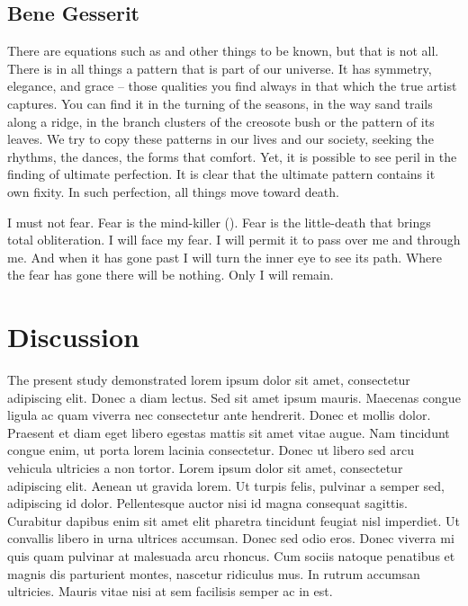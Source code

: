 \subsection*{Bene Gesserit}

There are equations such as  and other things to be known\cite{Hill78a}, but that is not all. There is in
all things a pattern that is part of our universe. It has symmetry, elegance, and grace -- those qualities you find
always in that which the true artist captures. You can find it in the turning of the seasons, in the way sand trails
along a ridge, in the branch clusters of the creosote bush or the pattern of its leaves. We try to copy these patterns
in our lives and our society, seeking the rhythms, the dances, the forms that comfort. Yet, it is possible to see peril
in the finding of ultimate perfection. It is clear that the ultimate pattern contains it own fixity. In such
perfection, all things move toward death.

 I must not fear. Fear is the mind-killer (). Fear is the little-death that brings total
obliteration. I will face my fear. I will permit it to pass over me and through me. And when it has gone past I will
turn the inner eye to see its path. Where the fear has gone there will be nothing. Only I will remain. 

\section*{Discussion}

The present study demonstrated lorem ipsum dolor sit amet, consectetur adipiscing elit. Donec a diam lectus. Sed sit
amet ipsum mauris. Maecenas congue ligula ac quam viverra nec consectetur ante hendrerit. Donec et mollis dolor.
Praesent et diam eget libero egestas mattis sit amet vitae augue. Nam tincidunt congue enim, ut porta lorem lacinia
consectetur. Donec ut libero sed arcu vehicula ultricies a non tortor. Lorem ipsum dolor sit amet, consectetur
adipiscing elit. Aenean ut gravida lorem. Ut turpis felis, pulvinar a semper sed, adipiscing id dolor. Pellentesque
auctor nisi id magna consequat sagittis. Curabitur dapibus enim sit amet elit pharetra tincidunt feugiat nisl
imperdiet. Ut convallis libero in urna ultrices accumsan. Donec sed odio eros. Donec viverra mi quis quam pulvinar at
malesuada arcu rhoncus. Cum sociis natoque penatibus et magnis dis parturient montes, nascetur ridiculus mus. In rutrum
accumsan ultricies. Mauris vitae nisi at sem facilisis semper ac in est.

